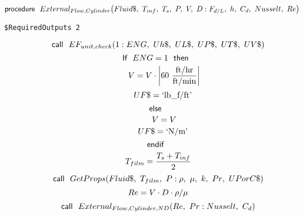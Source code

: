 \documentclass[10pt,fleqn]{article}
\newcommand{\F}[1]{\mbox{$#1$}}
\newcommand{\K}[1]{\mbox{\sf#1\ \ \mit}}
\newcommand{\KS}[1]{\mbox{\sf\ \ #1\ \ \mit}}
\newcommand{\SC}[1]{\mbox{`#1'}\  }
\newcommand{\V}[1]{\mbox{$ #1 $}}
\newcommand{\I}{\mbox{\hspace{0.20in}}}
\begin{document}
\vspace{0.1 in}
\begin{equation}
\label{EES Eqn:156}
\K{procedure} \F{External_{Flow,Cylinder}}{ \left( Fluid\$,\ T_{inf},\ T_{s},\  P,\ V,\ D: F_{d/L},\ h,\ C_{d},\ \V{Nusselt} ,\ \V{Re}  \right) } 
\end{equation}
\begin{verbatim}
$RequiredOutputs 2
\end{verbatim}  \begin{equation}
\I \label{EES Eqn:157}
\K{call} \F{EF_{unit,check}}{ \left( 1:\V{ENG} ,\ Uh\$,\ UL\$,\ UP\$,\ UT\$,\ UV\$ \right) } 
\end{equation}
\begin{equation}
\I \label{EES Eqn:158}
\K{If} \V{ENG} =1 \KS{then} 
\end{equation}
\begin{equation}
\I \I \label{EES Eqn:159}
V=V\cdot \rm { \left|60\ \frac {\rm{ft/hr}}{\rm{ft/min}}\right|} 
\end{equation}
\begin{equation}
\I \I \label{EES Eqn:160}
UF\$=\SC{lb\_f/ft} 
\end{equation}
\begin{equation}
\I \label{EES Eqn:161}
\K{else} 
\end{equation}
\begin{equation}
\I \I \label{EES Eqn:162}
V=V 
\end{equation}
\begin{equation}
\I \I \label{EES Eqn:163}
UF\$=\SC{N/m} 
\end{equation}
\begin{equation}
\I \label{EES Eqn:164}
\K{endif} 
\end{equation}
\begin{equation}
\I \label{EES Eqn:165}
T_{film}=\frac {T_{s}+T_{inf}}{ 2 } 
\end{equation}
\begin{equation}
\I \label{EES Eqn:166}
\K{call} \F{GetProps}{ \left( Fluid\$,\ T_{film},\ P: \rho,\ \mu,\ k,\ \V{Pr} ,\ UPorC\$ \right) } 
\end{equation}
\begin{equation}
\I \label{EES Eqn:167}
\V{Re} =V\cdot D\cdot \rho/\mu 
\end{equation}
\begin{equation}
\I \label{EES Eqn:168}
\K{call} \F{External_{Flow,Cylinder,ND}}{ \left( \V{Re} ,\ \V{Pr} :\V{Nusselt} ,\ C_{d} \right) } 
\end{equation}
\end{document}
